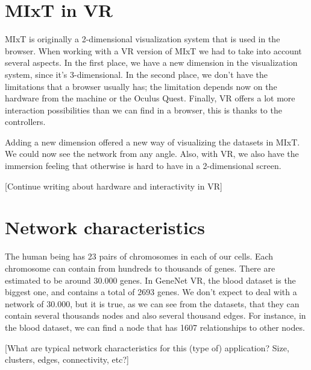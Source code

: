 \section{MIxT in VR}
MIxT is originally a 2-dimensional visualization system that is used in the browser. When working with a VR version of MIxT we had to take into account several aspects. In the first place, we have a new dimension in the visualization system, since it's 3-dimensional. In the second place, we don't have the limitations that a browser usually has; the limitation depends now on the hardware from the machine or the Oculus Quest. Finally, VR offers a lot more interaction possibilities than we can find in a browser, this is thanks to the controllers.

Adding a new dimension offered a new way of visualizing the datasets in MIxT. We could now see the network from any angle. Also, with VR, we also have the immersion feeling that otherwise is hard to have in a 2-dimensional screen.

[Continue writing about hardware and interactivity in VR]

\section{Network characteristics}
The human being has 23 pairs of chromosomes in each of our cells. Each chromosome can contain from hundreds to thousands of genes. There are estimated to be around 30.000 genes. In GeneNet VR, the blood dataset is the biggest one, and contains a total of 2693 genes. We don't expect to deal with a network of 30.000, but it is true, as we can see from the datasets, that they can contain several thousands nodes and also several thousand edges. For instance, in the blood dataset, we can find a node that has 1607 relationships to other nodes.

[What are typical network characteristics for this (type of) application? Size, clusters, edges, connectivity, etc?]
